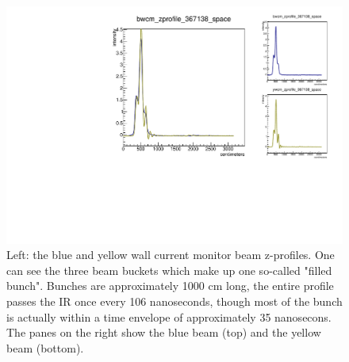 \begin{figure}
\begin{center}
\includegraphics[width=\linewidth,height=\textheight,keepaspectratio]{./figures/367138_wcm_zprofile}
\caption{ 
Left: the blue and yellow wall current monitor beam z-profiles. One can see the
three beam buckets which make up one so-called "filled bunch". Bunches are
approximately 1000 cm long, the entire profile passes the IR once every 106
nanoseconds, though most of the bunch is actually within a time envelope of
approximately 35 nanosecons. The panes on the right show the blue beam (top)
and the yellow beam (bottom).
}
\label{fig:367138_wcm_zprofile}
\end{center}
\end{figure}
